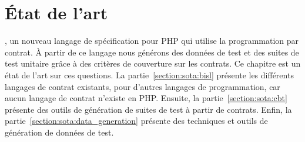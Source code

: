 \chapter{État de l'art}
\label{chapter:state}

\mminitoc

, un nouveau langage de spécification pour PHP qui utilise la
programmation par contrat. À partir de ce langage nous générons des données de
test et des suites de test unitaire grâce à des critères de couverture sur les
contrats. Ce chapitre est un état de l'art sur ces questions.  La
partie~\ref{section:sota:bisl} présente les différents langages de contrat
existants, pour d'autres langages de programmation, car aucun langage de contrat
n'existe en PHP. Ensuite, la partie~\ref{section:sota:cbt} présente des outils
de génération de suites de test à partir de contrats. Enfin, la
partie~\ref{section:sota:data_generation} présente des techniques et outils de
génération de données de test.

